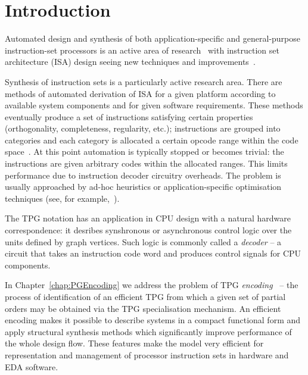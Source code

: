 \section{Introduction}

Automated design and synthesis of both application-specific and general-purpose
instruction-set processors is an active area of research~\cite{2006_dutt_chapter}
with instruction set architecture (ISA) design seeing new techniques and improvements~\cite{2002_qin_date}.


Synthesis of instruction sets is a particularly active research area.
There are methods of automated derivation of ISA for a given platform
according to available system components
and for given software requirements. These methods eventually produce a
set of instructions satisfying certain properties (orthogonality,
completeness, regularity, etc.); instructions are grouped into categories
and each category is allocated a certain opcode range within the
code space~\cite{2003_nohl_dac}. At this point automation is typically
stopped or becomes trivial: the instructions are given arbitrary codes
within the allocated ranges. This limits performance due to instruction
decoder circuitry overheads. The problem is usually approached by
ad-hoc heuristics or application-specific optimisation techniques
(see, for example,~\cite{2002_lee_iccad}).

The TPG notation has an application in CPU design with a natural hardware correspondence: it desribes synshronous or asynchronous control logic over the units defined by graph vertices. Such logic is commonly called a \emph{decoder} -- a circuit that takes an instruction code word and produces control signals for CPU components.  

In Chapter~\ref{chap:PGEncoding} we address the problem of TPG \emph{encoding}~\cite{2009_mokhov_phd} -- the process of identification of an efficient TPG from which a given set of partial orders may be obtained via the TPG specialisation mechanism. An efficient encoding makes it possible to describe systems in
a compact functional form and apply structural synthesis methods which
significantly improve performance of the whole design flow. These
features make the model very efficient for representation and management
of processor instruction sets in hardware and EDA software. 

